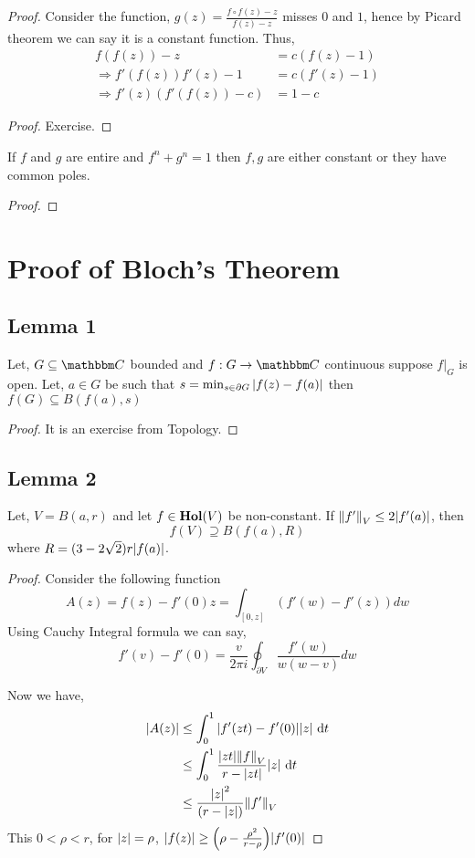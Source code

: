 \documentclass[../ComplexAnalysis_Notes.tex]{subfiles}
\begin{document}
\textit{Proof.} Consider the function, $g(z) = \frac{f\circ f (z)-z}{f(z)-z}$ misses $0$ and $1$, hence by Picard theorem we can say it is a constant function. Thus, \begin{align*}
    f(f(z))-z                     & =c(f(z)-1)     \\
    \Rightarrow f'(f(z))f'(z) - 1 & = c ( f'(z)-1) \\
    \Rightarrow f'(z)(f'(f(z))-c) & = 1-c
\end{align*}

\begin{proof}
    Exercise.
\end{proof}

\begin{corollary}
    If $f$ and $g$ are entire and $f^n+g^n=1$ then $f,g$ are either constant or they have common poles.
\end{corollary}

\begin{proof}

\end{proof}

\section*{Proof of Bloch's Theorem}

\subsection*{Lemma 1} Let, $G \subseteq \C$ bounded and $f: G \to \C$ continuous suppose $f|_G$ is open. Let, $a \in G$ be such that $s = \min_{s \in \partial G} \abs{f(z)-f(a)}$ then $f(G)\subseteq B(f(a),s)$

\begin{proof}
    It is an exercise from Topology.
\end{proof}

\subsection*{Lemma 2}

Let, $V = B(a,r)$ and let $f \in \operatorname{\mathbf{Hol}}(V)$ be non-constant. If $\norm{f'}_V \leq 2\abs{f'(a)}$, then $$f(V)\supseteq B(f(a),R)$$ where $R = (3-2\sqrt{2})r \abs{f(a)}$.

\begin{proof}
    Consider the following function $$A(z)=f(z)-f'(0)z = \int_{[0,z]} (f'(w)-f'(z))dw$$ Using Cauchy Integral formula we can say, $$f'(v)-f'(0) = \frac{v}{2\pi i} \oint_{\partial V} \frac{f'(w)}{w(w-v)} dw$$

    Now we have,
    \begin{align*}
        \abs{A(z)}
         & \leq\int_{0}^{1} \abs{f'(zt)-f'(0)}\abs{z} \, \dd{t}                   \\
         & \leq \int_0^1  \frac{\abs{zt}\norm{f}_V}{r-\abs{zt}} \abs{z} \, \dd{t} \\
         & \leq \frac{\abs{z}^2}{(r-\abs{z})} \norm{f'}_{V}
    \end{align*}
    This $0 <\rho <r$, for $\abs{z}=\rho$, $\abs{f(z)} \geq \qty(\rho - \frac{\rho^2}{r-\rho})\abs{f'(0)}$
\end{proof}
\end{document}
